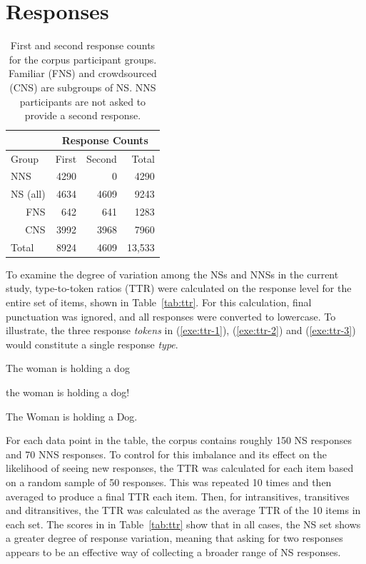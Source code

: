 \section{Responses}
\label{sec:responses}

\begin{table}[htb!]
\begin{center}
\begin{tabular}{|l||r|r||r|}
\hline
& \multicolumn{3}{|c|}{Response Counts} \\
\hline
 Group & First & Second & Total \\
\hline
\hline
NNS & 4290 & 0 & 4290 \\
\hline
\hline
NS (all) & 4634 & 4609 & 9243 \\ %
\hline
\multicolumn{1}{|r||}{FNS} & 642 & 641 & 1283 \\ 
\hline
\multicolumn{1}{|r||}{CNS} & 3992 & 3968 & 7960 \\
\hline
\hline
Total & 8924 & 4609 & 13,533 \\
\hline
\end{tabular}
\caption{\label{tab:response-counts} First and second response counts for the corpus participant groups. Familiar (FNS) and crowdsourced (CNS) are subgroups of NS. NNS participants are not asked to provide a second response.}
\end{center}
\end{table}

To examine the degree of variation among the NSs and NNSs  in the current study, type-to-token ratios (TTR) were calculated on the response level for the entire set of items, shown in Table~\ref{tab:ttr}. For this calculation, final punctuation was ignored, and all responses were converted to lowercase. To illustrate, the three response \textit{tokens} in (\ref{exe:ttr-1}), (\ref{exe:ttr-2}) and (\ref{exe:ttr-3}) would constitute a single response \textit{type}.

\begin{exe}[h!]
  \ex\label{exe:ttr-1}The woman is holding a dog
\end{exe}
\begin{exe}[h!]
  \ex\label{exe:ttr-2}the woman is holding a dog!
\end{exe}
\begin{exe}[h!]
  \ex\label{exe:ttr-3}The Woman is holding a Dog.
\end{exe}

For each data point in the table, the corpus contains roughly 150 NS responses and 70 NNS responses. To control for this imbalance and its effect on the likelihood of seeing new responses, the TTR was calculated for each item based on a random sample of 50 responses.  This was repeated 10 times and then averaged to produce a final TTR each item. Then, for intransitives, transitives and ditransitives, the TTR was calculated as the average TTR of the 10 items in each set. The scores in in Table~\ref{tab:ttr} show that in all cases, the NS set shows a greater degree of response variation, meaning that asking for two responses appears to be an effective way of collecting a broader range of NS responses.

